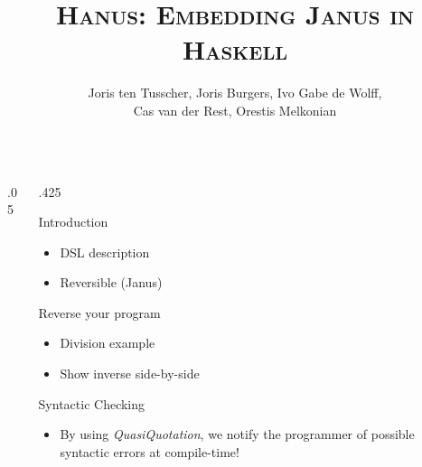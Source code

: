 \documentclass[final,hyperref={pdfpagelabels=false}]{beamer}
\title{\LARGE \textsc{Hanus: Embedding Janus in Haskell}} %
\author{\vspace{1cm} Joris ten Tusscher, Joris Burgers, Ivo Gabe de Wolff,\\ Cas van der Rest, Orestis Melkonian\vspace{1cm}} %
\institute{\Large \emph{Faculty of Science, Utrecht University}} %
\newcommand\sepsize{.05\textwidth}
\newcommand\colsize{.425\textwidth}
\begin{document}

\begin{frame}[t] %

\begin{columns}[t] %

\begin{column}{\sepsize}\end{column} %

\begin{column}{\colsize} %

            
\begin{block}{Introduction}
	\begin{itemize}
		\item DSL description
		\item Reversible (Janus)
	\end{itemize}
\end{block}

\begin{block}{Reverse your program}
	\begin{itemize}
		\item Division example
		\item Show inverse side-by-side
	\end{itemize}
\end{block}

\begin{block}{Syntactic Checking}
	\begin{itemize}
		\item By using \textit{QuasiQuotation}, we notify the programmer of possible syntactic errors at compile-time!
	\end{itemize}
\end{block}


\end{column} %


\end{columns}
\end{frame}
\end{document}
